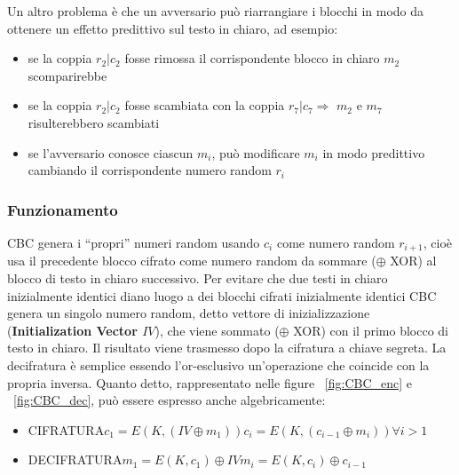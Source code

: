 Un altro problema è che un avversario può riarrangiare i blocchi in modo da ottenere un effetto predittivo sul testo in chiaro, ad esempio:
\begin{itemize}
\item se la coppia $r_{2}|c_{2}$ fosse rimossa il corrispondente blocco in chiaro $m_{2}$ scomparirebbe 
\item se la coppia $r_{2}|c_{2}$ fosse scambiata con la coppia $r_{7}|c_{7} \Rightarrow$ $m_{2}$ e $m_{7}$ risulterebbero scambiati
\item se l’avversario conosce ciascun  $m_{i}$, può modificare  $m_{i}$ in modo predittivo cambiando il corrispondente numero random $r_{i}$
\end{itemize}

\subsubsection{Funzionamento}
CBC genera i “propri” numeri random usando $c_{i}$ come numero random $r_{i+1}$, cioè usa il precedente blocco cifrato come numero random da sommare ($\oplus$ XOR) al blocco di testo in chiaro successivo.\newline
Per evitare che due testi in chiaro inizialmente identici diano luogo a dei blocchi cifrati inizialmente identici CBC genera un singolo numero random, detto vettore di inizializzazione (\textbf{Initialization Vector $IV$}), che viene sommato ($\oplus$ XOR) con il primo blocco di testo in chiaro. \newline
Il risultato viene trasmesso dopo la cifratura a chiave segreta. \newline
La decifratura è semplice essendo l'or-esclusivo un'operazione che coincide con la propria inversa.\newline
Quanto detto, rappresentato nelle figure \figurename ~\ref{fig:CBC_enc} e \figurename ~\ref{fig:CBC_dec}, può essere espresso anche algebricamente:
\begin{itemize}
\item CIFRATURA\newline $c_{1} = E(K, (IV \oplus m_{1}))$\newline $c_{i} = E(K, (c_{i-1} \oplus m_{i})) \forall i > 1$
\item DECIFRATURA\newline $m_{1} = E(K,c_{1})\oplus IV$\newline $m_{i} = E(K,c_{i})\oplus c_{i-1}$
\end{itemize}
